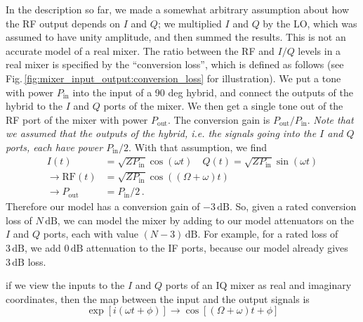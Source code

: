 

In the description so far, we made a somewhat arbitrary assumption about how the RF output depends on $I$ and $Q$; we multiplied $I$ and $Q$ by the LO, which was assumed to have unity amplitude, and then summed the results.
This is not an accurate model of a real mixer.
The ratio between the RF and $I/Q$ levels in a real mixer is specified by the ``conversion loss'', which is defined as follows (see Fig.\,\ref{fig:mixer_input_output:conversion_loss} for illustration).
We put a tone with power $P_\text{in}$ into the input of a 90 deg hybrid, and connect the outputs of the hybrid to the $I$ and $Q$ ports of the mixer.
We then get a single tone out of the RF port of the mixer with power $P_\text{out}$.
The conversion gain is $P_\text{out}/P_\text{in}$.
\emph{Note that we assumed that the outputs of the hybrid, i.e. the signals going into the $I$ and $Q$ ports, each have power $P_\text{in}/2$}.
With that assumption, we find
\begin{align}
I(t) &= \sqrt{Z P_\text{in}} \cos(\omega t) \quad Q(t) = \sqrt{Z P_\text{in}} \sin(\omega t) \nonumber \\
\rightarrow \text{RF}(t) &= \sqrt{Z P_\text{in}} \cos((\Omega + \omega) t) \nonumber \\
\rightarrow P_\text{out} &= P_\text{in} / 2 \, . \nonumber
\end{align}
Therefore our model has a conversion gain of $-3\,\text{dB}$.
So, given a rated conversion loss of $N\,\text{dB}$, we can model the mixer by adding to our model attenuators on the $I$ and $Q$ ports, each with value $(N-3) \, \text{dB}$.
For example, for a rated loss of $3\,\text{dB}$, we add $0\, \text{dB}$ attenuation to the IF ports, because our model already gives $3\,\text{dB}$ loss.

if we view the inputs to the $I$ and $Q$ ports of an IQ mixer as real and imaginary coordinates, then the map between the input and the output signals is \begin{equation}
\exp[i(\omega t + \phi)] \rightarrow \cos[(\Omega+\omega)t + \phi] \end{equation}


